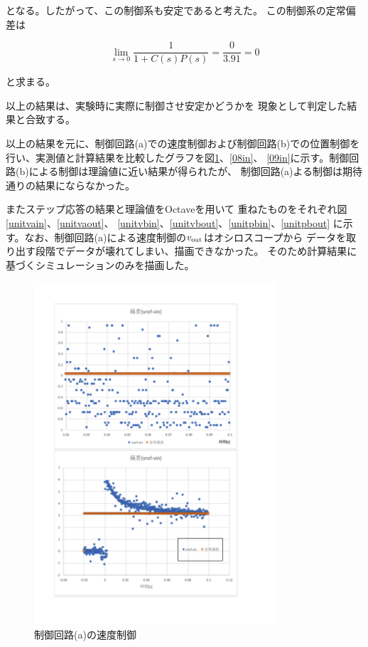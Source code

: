 \documentclass[uplatex, 11pt,a4j, titlepage]{jsarticle}
\begin{document}
となる。したがって、この制御系も安定であると考えた。
この制御系の定常偏差は

\begin{equation}
    \lim_{s \to 0} \frac{1}{1 + C(s)P(s)} 
        = \frac{0}{3.91} = 0
\end{equation}

と求まる。

以上の結果は、実験時に実際に制御させ安定かどうかを
現象として判定した結果と合致する。

以上の結果を元に、制御回路(a)での速度制御および制御回路(b)での位置制御を
行い、実測値と計算結果を比較したグラフを図\ref{07in}、\ref{08in}、
\ref{09in}に示す。制御回路(b)による制御は理論値に近い結果が得られたが、
制御回路(a)よる制御は期待通りの結果にならなかった。

またステップ応答の結果と理論値をOctaveを用いて
重ねたものをそれぞれ図\ref{unitvain}、\ref{unitvaout}、
\ref{unitvbin}、\ref{unitvbout}、\ref{unitpbin}、\ref{unitpbout}
に示す。なお、制御回路(a)による速度制御の$v_{\rm out}$はオシロスコープから
データを取り出す段階でデータが壊れてしまい、描画できなかった。
そのため計算結果に基づくシミュレーションのみを描画した。

\begin{figure}[h]
    \centering
    \includegraphics[width=9cm]{07in.pdf}
    \caption{制御回路(a)の速度制御}
    \label{07in}
\end{figure}
\end{document}
